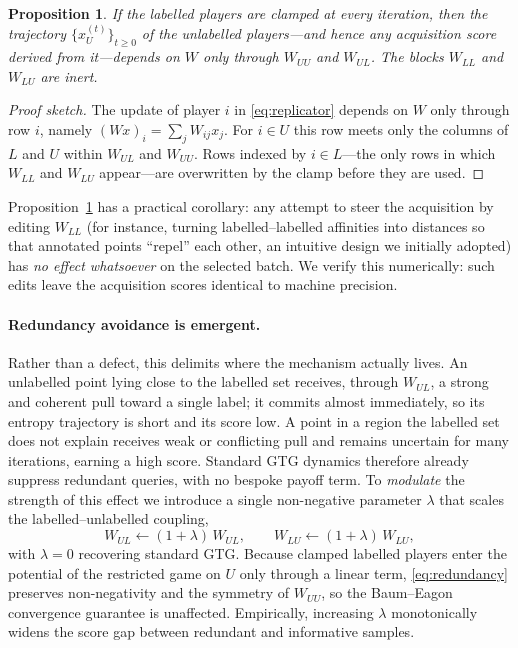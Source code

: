 \documentclass[11pt]{article}
\newtheorem{proposition}{Proposition}
\begin{document}
\begin{proposition}\label{prop:inert}
If the labelled players are clamped at every iteration, then the trajectory
$\{x_U^{(t)}\}_{t\ge 0}$ of the unlabelled players---and hence any acquisition score
derived from it---depends on $W$ only through $W_{UU}$ and $W_{UL}$. The blocks
$W_{LL}$ and $W_{LU}$ are inert.
\end{proposition}

\begin{proof}[Proof sketch]
The update of player $i$ in \eqref{eq:replicator} depends on $W$ only through row
$i$, namely $(Wx)_i=\sum_j W_{ij}x_j$. For $i\in U$ this row meets only the columns
of $L$ and $U$ within $W_{UL}$ and $W_{UU}$. Rows indexed by $i\in L$---the only rows
in which $W_{LL}$ and $W_{LU}$ appear---are overwritten by the clamp before they are
used. \end{proof}

Proposition~\ref{prop:inert} has a practical corollary: any attempt to steer the
acquisition by editing $W_{LL}$ (for instance, turning labelled--labelled affinities
into distances so that annotated points ``repel'' each other, an intuitive design we
initially adopted) has \emph{no effect whatsoever} on the selected batch. We verify
this numerically: such edits leave the acquisition scores identical to machine
precision.

\paragraph{Redundancy avoidance is emergent.} Rather than a defect, this delimits
where the mechanism actually lives. An unlabelled point lying close to the labelled
set receives, through $W_{UL}$, a strong and coherent pull toward a single label; it
commits almost immediately, so its entropy trajectory is short and its score low.
A point in a region the labelled set does not explain receives weak or conflicting
pull and remains uncertain for many iterations, earning a high score. Standard GTG
dynamics therefore already suppress redundant queries, with no bespoke payoff term.
To \emph{modulate} the strength of this effect we introduce a single non-negative
parameter $\lambda$ that scales the labelled--unlabelled coupling,
\begin{equation}
  W_{UL} \leftarrow (1+\lambda)\,W_{UL},
  \qquad W_{LU} \leftarrow (1+\lambda)\,W_{LU},
  \label{eq:redundancy}
\end{equation}
with $\lambda=0$ recovering standard GTG. Because clamped labelled players enter the
potential of the restricted game on $U$ only through a linear term, \eqref{eq:redundancy}
preserves non-negativity and the symmetry of $W_{UU}$, so the Baum--Eagon convergence
guarantee is unaffected. Empirically, increasing $\lambda$ monotonically widens the
score gap between redundant and informative samples. %
\end{document}
